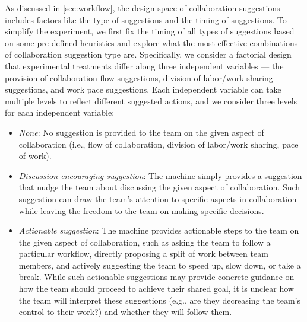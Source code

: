 As discussed in \ref{sec:workflow}, the design space of collaboration suggestions includes factors like the type of suggestions
and the timing of suggestions. To simplify the experiment, we first fix the timing of all types of suggestions based on some pre-defined heuristics and explore what the most effective combinations of collaboration suggestion type 
are. Specifically, we consider a factorial design that experimental treatments differ along three independent variables --- the provision of collaboration flow suggestions, 
division of labor/work sharing suggestions, and 
work pace suggestions. 
Each independent variable can take multiple levels to reflect different %
suggested actions, and we 
consider three levels for each independent variable:
\begin{itemize}[leftmargin=*]
\item {\em None}: No suggestion is provided to the team on the given aspect of collaboration (i.e., flow of collaboration, division of labor/work sharing, pace of work).
\item {\em Discussion encouraging suggestion}: The machine simply provides a suggestion that nudge the team about discussing the given aspect of collaboration. %
Such suggestion can draw the team's attention to specific aspects in collaboration while leaving the freedom to the team on making specific decisions.
\item {\em Actionable suggestion}: The machine provides actionable steps to the team on the given aspect of collaboration, such as asking the team to follow a particular workflow, directly proposing a split of work between team members, and actively suggesting the team to speed up, slow down, or take a break. While such actionable suggestions may provide concrete guidance on how the team should proceed to achieve their shared goal, it is unclear how the team will interpret these suggestions (e.g., are they decreasing the team's control to their work?) and whether they will follow them. 
\end{itemize}


